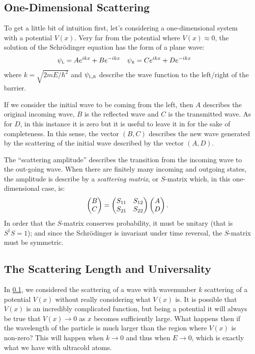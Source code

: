 \documentclass[
  a4paper,             %
  11pt,                %
  oneside,             %
  onecolumn,           %
  bibliography=totoc,  %
  final,               %
]{scrartcl}
\begin{document}
\subsection{One-Dimensional Scattering}
\label{subsec:one-dimensional_scattering}

To get a little bit of intuition first, let's considering a one-dimensional
system with a potential \(V(x)\).  Very far from the potential where \(V(x)
\approx 0\), the solution of the Schr\"odinger equation has the form of a plane
wave:
\begin{align}
  \label{eq:1d_scattering_wave}
  \psi_{\textsc{l}} &= A e^{ikx} + B e^{-ikx} &
  \psi_{\textsc{r}} &= C e^{ikx} + D e^{-ikx}
\end{align}
where \(k = \sqrt{2 m E / \hbar^{2}}\) and \(\psi_{\textsc{l},\textsc{r}}\) describe the
wave function to the left/right of the barrier.

If we consider the initial wave to be coming from the left, then \(A\) describes
the original incoming wave, \(B\) is the reflected wave and \(C\) is the
transmitted wave.  As for \(D\), in this instance it is zero but it is useful to
leave it in for the sake of completeness.  In this sense, the vector \((B, C)\)
describes the new wave generated by the scattering of the initial wave described
by the vector \((A, D)\).

The \enquote{scattering amplitude} describes the transition from the incoming
wave to the out-going wave.  When there are finitely many incoming and outgoing
states, the amplitude is describe by a \emph{scattering matrix}, or \(S\)-matrix
which, in this one-dimensional case, is:
\begin{equation}
  \label{eq:S-matrix}
  \begin{pmatrix}B \\ C\end{pmatrix} = \begin{pmatrix}S_{11} & S_{12} \\ S_{21} & S_{22}\end{pmatrix} \begin{pmatrix}A \\ D\end{pmatrix}.
\end{equation}
In order that the \(S\)-matrix conserves probability, it must be unitary (that
is \(S^{\dagger} S = 1\)); and since the Schr\"odinger is invariant under time
reversal, the \(S\)-matrix must be symmetric.

\subsection{The Scattering Length and Universality}
\label{subsec:the_scattering_length_and_universality}

In \cref{subsec:one-dimensional_scattering}, we considered the scattering of a
wave with wavenumber \(k\) scattering of a potential \(V(x)\) without really
considering what \(V(x)\) is.  It is possible that \(V(x)\) is an incredibly
complicated function, but being a potential it will always be true that \(V(x)
\to 0\) as \(x\) becomes sufficiently large.  What happens then if the
wavelength of the particle is much larger than the region where \(V(x)\) is
non-zero?  This will happen when \(k \to 0\) and thus when \(E \to 0\), which is
exactly what we have with ultracold atoms.
\end{document}

